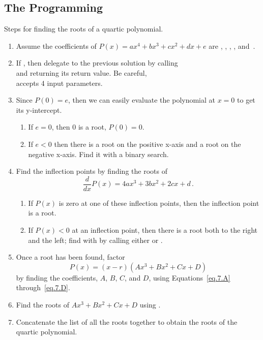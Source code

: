 \subsection{The Programming}

Steps for finding the roots of a quartic polynomial.

\begin{enumerate}
\item Assume the coefficients of $P(x) = a x^4 + b x^3 + c x^2 + d x + e$ are
  ,  ,  ,  , and~.
\item If , then delegate to the previous solution by
  calling \\
   and returning its return
  value.  Be careful, \\
   accepts 4 input
  parameters.
\item Since $P(0) = e$, then we can easily evaluate the polynomial at $x=0$ to get its y-intercept.
  \begin{enumerate}
  \item If $e = 0$, then 0 is a root, $P(0) = 0$.
  \item If $e<0$ then there is a root on the positive x-axis and a root on the negative x-axis.  Find it with a binary search.
  \end{enumerate}
\item Find the inflection points by finding the roots of \[\frac{d}{dx} P(x) = 4 a x^3 + 3 b x^2 + 2 c x + d\,.\]
  \begin{enumerate}
  \item If $P(x)$ is zero at one of these inflection points, then the inflection point is a root.
  \item If $P(x) < 0$ at an inflection point, then there is a root both to the right and the left;
    find with by calling either  or .    
  \end{enumerate}
\item Once a root has been found, factor \[P(x) = (x-r)(Ax^3 + Bx^2 + Cx + D)\] by finding the coefficients, $A$, $B$, $C$, and $D$,
  using Equations~\eqref{eq.7.A} through~\eqref{eq.7.D}.
\item Find the roots of $Ax^3 + Bx^2 + Cx + D$ using
  .
  \item Concatenate the list of all the roots together to obtain the roots of the quartic polynomial.
\end{enumerate}
